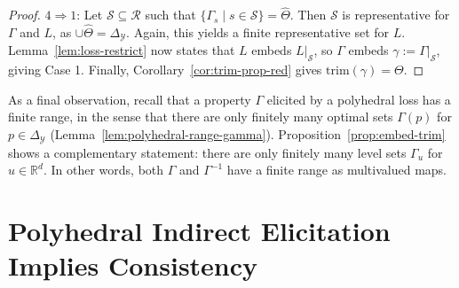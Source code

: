 \documentclass[twoside,11pt]{article}
\newcommand{\reals}{\mathbb{R}}
\newcommand{\simplex}{\Delta_\Y}
\newcommand{\R}{\mathcal{R}}
\newcommand{\Sc}{\mathcal{S}}
\newcommand{\U}{\mathcal{U}}
\newcommand{\Y}{\mathcal{Y}}
\newcommand{\trimred}{\mathrm{trim}}
\begin{document}
\begin{proof}
  $4 \Rightarrow 1$:
  Let $\Sc\subseteq\R$ such that $\{\Gamma_s \mid s\in\Sc\} = \hat \Theta$.
  Then $\Sc$ is representative for $\Gamma$ and $L$, as $\cup\hat\Theta = \simplex$.
  Again, this yields a finite representative set for $L$.
  Lemma~\ref{lem:loss-restrict} now states that $L$ embeds $L|_\Sc$, so $\Gamma$ embeds $\gamma := \Gamma|_\Sc$, giving Case 1.
  Finally, Corollary~\ref{cor:trim-prop-red} gives $\trimred(\gamma) = \Theta$.
\end{proof}

As a final observation, recall that a property $\Gamma$ elicited by a polyhedral loss has a finite range, in the sense that there are only finitely many optimal sets $\Gamma(p)$ for $p\in\simplex$ (Lemma~\ref{lem:polyhedral-range-gamma}).
Proposition~\ref{prop:embed-trim} shows a complementary statement: there are only finitely many level sets $\Gamma_u$ for $u\in\reals^d$.
In other words, both $\Gamma$ and $\Gamma^{-1}$ have a finite range as multivalued maps.

\section{Polyhedral Indirect Elicitation Implies Consistency}
\label{sec:poly-ie-consistency}
\end{document}
